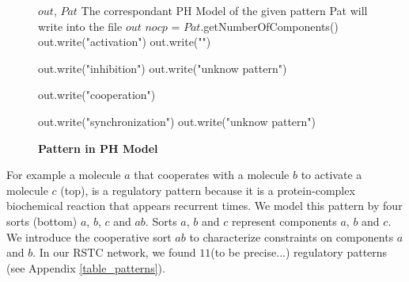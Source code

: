 
\begin{figure}[!t]
\begin{algorithmic}[1]
\REQUIRE $out$, $Pat$ 
\ENSURE The correspondant PH Model of the given pattern Pat will write into the file $out$
\STATE $nocp$ = $Pat$.getNumberOfComponents() 
\STATE 
{}
   \STATE out.write("activation")
   \STATE out.write("")
        
\ENDCASE
{}
  \STATE out.write("inhibition")
  \STATE 
\DEFAULT
 \STATE out.write("unknow pattern")
 \ENDDEFAULT
\ENDSWITCH
   
   
\ENDCASE

   \STATE out.write("cooperation")
        
\ENDCASE
{}
  \STATE out.write("synchronization")
\DEFAULT
 \STATE out.write("unknow pattern")
 \ENDDEFAULT
\ENDSWITCH
   
   
\ENDCASE
\ENDSWITCH
\end{algorithmic}
\caption{\bf Pattern in PH Model} \label{PHModel}
\end{figure}


For example a molecule $a$ that cooperates with a molecule $b$ to activate a molecule $c$  (top), is a regulatory pattern because it is a protein-complex biochemical reaction that appears recurrent times.  
We model this pattern by four sorts  (bottom) $a$, $b$, $c$ and $ab$. Sorts $a$, $b$ and $c$
represent components $a$, $b$ and $c$. We introduce the cooperative sort $ab$ to characterize constraints on components $a$ and $b$.
In our RSTC network, we found $11$(to be precise...) regulatory patterns (see Appendix \ref{table_patterns}). 

